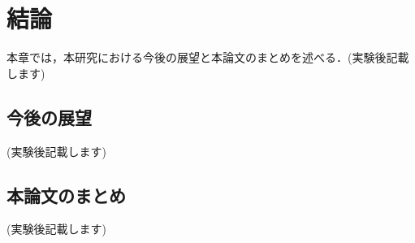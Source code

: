 \chapter{結論}
本章では，本研究における今後の展望と本論文のまとめを述べる．(実験後記載します)

\section{今後の展望}
(実験後記載します)
\section{本論文のまとめ}
(実験後記載します)